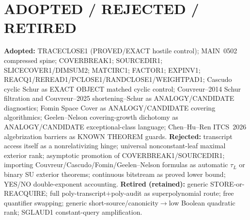 \documentclass[11pt]{article}
\begin{document}
\section*{ADOPTED / REJECTED / RETIRED}
\textbf{Adopted:} TRACECLOSE1 (PROVED/EXACT hostile control); MAIN~0502 compressed spine;
COVERBREAK1; SOURCEDIR1; SLICECOVER1/DIMSUM2; MATCIRC1; FACTOR1; EXPINV1;
REACQ1/REREAD1/PCLOSE1/RANDCLOSE1/WEIGHTPAD1; Cascudo cyclic Schur as EXACT OBJECT
matched cyclic control; Couvreur--2014 Schur filtration and Couvreur--2025
shortening--Schur as ANALOGY/CANDIDATE diagnostics; Fomin Space Cover as
ANALOGY/CANDIDATE covering algorithmics; Geelen--Nelson covering-growth dichotomy as
ANALOGY/CANDIDATE exceptional-class language; Chen--Hu--Ren ITCS~2026 algebrization
barriers as KNOWN THEOREM guards.
\textbf{Rejected:} transcript access itself as a nonrelativizing hinge; universal
nonconstant-leaf maximal exterior rank; asymptotic promotion of COVERBREAK1/SOURCEDIR1;
importing Couvreur/Cascudo/Fomin/Geelen--Nelson formulas as automatic $\tau_L$ or binary
SU exterior theorems; continuous bitstream as proved lower bound; YES/NO double-exponent
accounting.
\textbf{Retired (retained):} generic STORE-or-REACQUIRE; full poly-transcript$+$poly-audit
as superpolynomial route; free quantifier swapping; generic short-source/canonicity$\to$low
Boolean quadratic rank; SGLAUD1 constant-query amplification.
\end{document}
